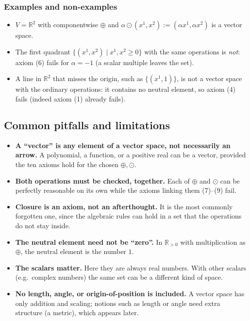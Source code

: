 \documentclass[11pt]{article}
\begin{document}
\subsubsection*{Examples and non-examples}
\begin{itemize}
  \item $V=\mathbb R^2$ with componentwise $\oplus$ and $\alpha\odot(x^1,x^2):=(\alpha x^1,\alpha x^2)$ is a vector space.
  \item The first quadrant $\{(x^1,x^2)\mid x^1,x^2\ge0\}$ with the same operations is \emph{not}: axiom (6) fails for $\alpha=-1$ (a scalar multiple leaves the set).
  \item A line in $\mathbb R^2$ that misses the origin, such as $\{(x^1,1)\}$, is not a vector space with the ordinary operations: it contains no neutral element, so axiom (4) fails (indeed axiom (1) already fails).
\end{itemize}

\subsection*{Common pitfalls and limitations}

\begin{itemize}
  \item \textbf{A ``vector'' is any element of a vector space, not necessarily an arrow.} A polynomial, a function, or a positive real can be a vector, provided the ten axioms hold for the chosen $\oplus,\odot$.
  \item \textbf{Both operations must be checked, together.} Each of $\oplus$ and $\odot$ can be perfectly reasonable on its own while the axioms linking them (7)--(9) fail.
  \item \textbf{Closure is an axiom, not an afterthought.} It is the most commonly forgotten one, since the algebraic rules can hold in a set that the operations do not stay inside.
  \item \textbf{The neutral element need not be ``zero''.} In $\mathbb R_{>0}$ with multiplication as $\oplus$, the neutral element is the number $1$.
  \item \textbf{The scalars matter.} Here they are always real numbers. With other scalars (e.g.\ complex numbers) the same set can be a different kind of space.
  \item \textbf{No length, angle, or origin-of-position is included.} A vector space has only addition and scaling; notions such as length or angle need extra structure (a metric), which appears later.
\end{itemize}
\end{document}
